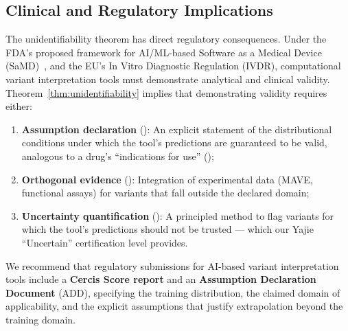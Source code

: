 \documentclass[11pt,a4paper]{article}
\theoremstyle{definition}
\begin{document}
\subsection{Clinical and Regulatory Implications}
The unidentifiability theorem has direct regulatory consequences.
Under the FDA's proposed framework for AI/ML-based Software as a Medical Device (SaMD)~\cite{fda2021aiml}, and the EU's In Vitro Diagnostic Regulation (IVDR), computational variant interpretation tools must demonstrate analytical and clinical validity.
Theorem~\ref{thm:unidentifiability} implies that demonstrating validity requires either:
\begin{enumerate}[leftmargin=*,label=(\roman*)]
    \item \textbf{Assumption declaration} (): An explicit statement of the distributional conditions under which the tool's predictions are guaranteed to be valid, analogous to a drug's ``indications for use'' ();
    \item \textbf{Orthogonal evidence} (): Integration of experimental data (MAVE, functional assays) for variants that fall outside the declared domain;
    \item \textbf{Uncertainty quantification} (): A principled method to flag variants for which the tool's predictions should not be trusted — which our Yajie ``Uncertain'' certification level provides.
\end{enumerate}
We recommend that regulatory submissions for AI-based variant interpretation tools include a \textbf{Cercis Score report} and an \textbf{Assumption Declaration Document} (ADD), specifying the training distribution, the claimed domain of applicability, and the explicit assumptions that justify extrapolation beyond the training domain.
\end{document}
